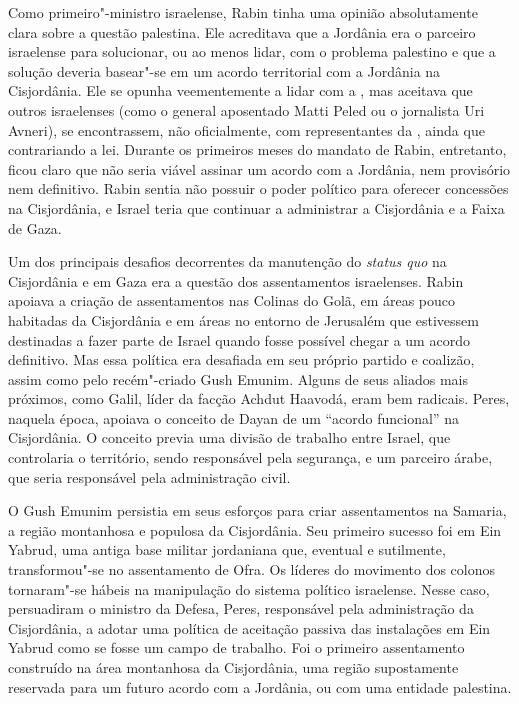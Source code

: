 Como primeiro"-ministro israelense, Rabin tinha uma opinião absolutamente
clara sobre a questão palestina. Ele acreditava que a Jordânia era o
parceiro israelense para solucionar, ou ao menos lidar, com o problema
palestino e que a solução deveria basear"-se em um acordo territorial com
a Jordânia na Cisjordânia. Ele se opunha veementemente a lidar com a ,
mas aceitava que outros israelenses (como o general aposentado Matti
Peled ou o jornalista Uri Avneri), se encontrassem, não oficialmente,
com representantes da , ainda que contrariando a lei. Durante os
primeiros meses do mandato de Rabin, entretanto, ficou claro que não
seria viável assinar um acordo com a Jordânia, nem provisório nem
definitivo. Rabin sentia não possuir o poder político para oferecer
concessões na Cisjordânia, e Israel teria que continuar a administrar a
Cisjordânia e a Faixa de Gaza.

Um dos principais desafios decorrentes da manutenção do \emph{status
quo} na Cisjordânia e em Gaza era a questão dos assentamentos
israelenses. Rabin apoiava a criação de assentamentos nas Colinas do
Golã, em áreas pouco habitadas da Cisjordânia e em áreas no entorno de
Jerusalém que estivessem destinadas a fazer parte de Israel quando fosse
possível chegar a um acordo definitivo. Mas essa política era desafiada
em seu próprio partido e coalizão, assim como pelo recém"-criado Gush
Emunim. Alguns de seus aliados mais próximos, como Galil, líder da
facção Achdut Haavodá, eram bem radicais. Peres, naquela época, apoiava
o conceito de Dayan de um ``acordo funcional'' na Cisjordânia. O
conceito previa uma divisão de trabalho entre Israel, que controlaria o
território, sendo responsável pela segurança, e um parceiro árabe, que
seria responsável pela administração civil.

O Gush Emunim persistia em seus esforços para criar assentamentos na
Samaria, a região montanhosa e populosa da Cisjordânia. Seu primeiro
sucesso foi em Ein Yabrud, uma antiga base militar jordaniana que,
eventual e sutilmente, transformou"-se no assentamento de Ofra. Os
líderes do movimento dos colonos tornaram"-se hábeis na manipulação do
sistema político israelense. Nesse caso, persuadiram o ministro da
Defesa, Peres, responsável pela administração da Cisjordânia, a adotar
uma política de aceitação passiva das instalações em Ein Yabrud como se
fosse um campo de trabalho. Foi o primeiro assentamento construído na
área montanhosa da Cisjordânia, uma região supostamente reservada para um
futuro acordo com a Jordânia, ou com uma entidade palestina.


